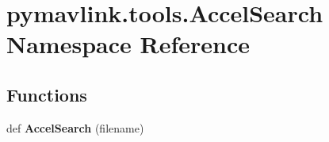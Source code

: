\hypertarget{namespacepymavlink_1_1tools_1_1AccelSearch}{}\section{pymavlink.\+tools.\+Accel\+Search Namespace Reference}
\label{namespacepymavlink_1_1tools_1_1AccelSearch}
\subsection*{Functions}
\begin{DoxyCompactItemize}
\item 
\mbox{\label{namespacepymavlink_1_1tools_1_1AccelSearch_a20e68a37811b32e425149b7751a0180b}} 
def {\bfseries Accel\+Search} (filename)
\end{DoxyCompactItemize}
